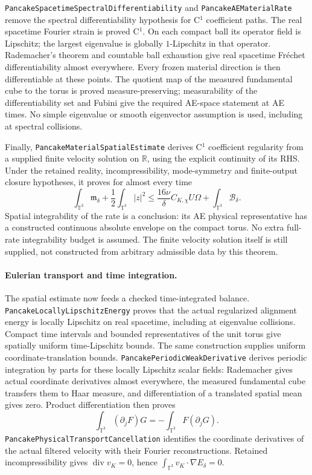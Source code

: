 \documentclass[11pt]{article}
\theoremstyle{definition}
\begin{document}
\texttt{PancakeSpacetimeSpectralDifferentiability} and
\texttt{PancakeAEMaterialRate} remove the spectral differentiability
hypothesis for C$^1$ coefficient paths. The real spacetime Fourier strain
is proved C$^1$. On each compact ball its operator field is Lipschitz;
the largest eigenvalue is globally $1$-Lipschitz in that operator.
Rademacher's theorem and countable ball exhaustion give real spacetime
Fr\'echet differentiability almost everywhere. Every frozen material
direction is then differentiable at these points. The quotient map of
the measured fundamental cube to the torus is proved measure-preserving;
measurability of the differentiability set and Fubini give the required
AE-space statement at AE times. No simple eigenvalue or smooth
eigenvector assumption is used, including at spectral collisions.

Finally, \texttt{PancakeMaterialSpatialEstimate} derives C$^1$ coefficient
regularity from a supplied finite velocity solution on $\mathbb R$,
using the explicit continuity of its RHS. Under the retained reality,
incompressibility, mode-symmetry and finite-output closure hypotheses,
it proves for almost every time
\[
 \int_{\mathbb T^3}\mathfrak m_\delta
       +\frac12\int_{\mathbb T^3}|z|^2
 \le \frac{16\nu}{\delta}C_{K,\chi}U\Omega
       +\int_{\mathbb T^3}\mathcal B_\delta.
\]
Spatial integrability of the rate is a conclusion: its AE physical
representative has a constructed continuous absolute envelope on the
compact torus. No extra full-rate integrability budget is assumed.
The finite velocity solution itself is still supplied, not constructed
from arbitrary admissible data by this theorem.

\paragraph{Eulerian transport and time integration.}
The spatial estimate now feeds a checked time-integrated balance.
\texttt{PancakeLocallyLipschitzEnergy} proves that the actual regularized
alignment energy is locally Lipschitz on real spacetime, including at
eigenvalue collisions. Compact time intervals and bounded representatives
of the unit torus give spatially uniform time-Lipschitz bounds. The same
construction supplies uniform coordinate-translation bounds.
\texttt{PancakePeriodicWeakDerivative} derives periodic integration by
parts for these locally Lipschitz scalar fields: Rademacher gives actual
coordinate derivatives almost everywhere, the measured fundamental cube
transfers them to Haar measure, and differentiation of a translated
spatial mean gives zero. Product differentiation then proves
\[
 \int_{\mathbb T^3}(\partial_j F)G
   =-\int_{\mathbb T^3}F(\partial_j G).
\]
\texttt{PancakePhysicalTransportCancellation} identifies the coordinate
derivatives of the actual filtered velocity with their Fourier
reconstructions. Retained incompressibility gives
$\operatorname{div}v_K=0$, hence
$\int_{\mathbb T^3}v_K\cdot\nabla E_\delta=0$.
\end{document}
